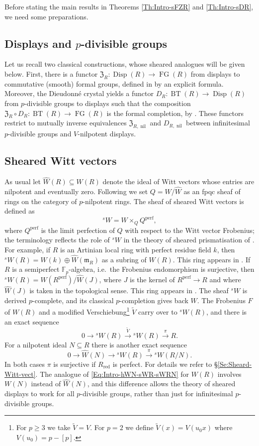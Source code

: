 \documentclass[a4paper,11pt]{amsart}
\theoremstyle{plain}
\theoremstyle{definition}
\theoremstyle{remark}
\newcommand{\beqn}{\begin{equation}}
\newcommand{\eeqn}{\end{equation}}
\numberwithin{equation}{section}
\newcommand{\Fm}{\mathfrak{m}}
\newcommand{\FZ}{\mathfrak{Z}}
\newcommand{\FF}{{\mathbb{F}}}
\DeclareMathOperator{\nil}{nil}
\DeclareMathOperator{\perf}{perf}
\DeclareMathOperator{\red}{red}
\DeclareMathOperator{\BT}{BT}
\DeclareMathOperator{\Disp}{Disp}
\DeclareMathOperator{\FG}{FG}
\newcommand{\limperf}{^{\perf}}
\newcommand{\sW}{{}^sW}
\begin{document}
Before stating the main results in Theorems \ref{Th:Intro-sFZR} and \ref{Th:Intro-sDR}, we need some preparations.

\subsection{Displays and $p$-divisible groups}

Let us recall two classical constructions, whose sheared analogues will be given below. 
First, there is a functor $\FZ_R\colon\Disp(R)\to\FG(R)$ from displays to commutative (smooth) formal groups, defined in \cite{Zink:The-display} by an explicit formula. Moreover, the Dieudonn\'e crystal yields a functor $D_R\colon\BT(R)\to\Disp(R)$ from $p$-divisible groups to displays such that the composition $\FZ_R\circ D_R\colon\BT(R)\to\FG(R)$ is the formal completion, by \cite{Lau:Smoothness}. These functors restrict to mutually inverse equivalences $\FZ_{R,\nil}$ and $D_{R,\nil}$ between infinitesimal $p$-divisible groups and $V$-nilpotent displays.

\subsection{Sheared Witt vectors}

As usual let $\hat W(R)\subseteq W(R)$ denote the ideal of Witt vectors whose entries are nilpotent and eventually zero.
Following \cite{Drinfeld:Ring-stacks-conjecturally, BMVZ} we set $Q=W/\hat W$ as an fpqc sheaf  of rings  on the category of $p$-nilpotent rings. The sheaf of sheared Witt vectors is defined as
\[
\sW=W\times_QQ\limperf,
\] 
where $Q\limperf$ is the limit perfection of $Q$ with respect to the Witt vector Frobenius; the terminology reflects the role of $\sW$ in the theory of sheared prismatisation of \cite{BKMVZ}.
For example, if $R$ is an Artinian local ring with perfect residue field $k$, then $\sW(R)=W(k)\oplus\hat W(\Fm_R)$ as a subring of $W(R)$. 
This ring appears in \cite{Zink:Dieudonne}.
If $R$ is a semiperfect $\FF_p$-algebra, i.e.\ the Frobenius endomorphism is surjective, then $\sW(R)=W(R\limperf)/\hat W(J)$, where $J$ is the kernel of $R\limperf\to R$ and where $\hat W(J)$ is taken in the topological sense. 
This ring appears in \cite{Lau:Gerbe}.
The sheaf $\sW$ is derived $p$-complete, and its classical $p$-completion gives back $W$.
The Frobenius $F$ of $W(R)$ and a modified Verschiebung\footnote{For $p\ge 3$ we take $\tilde V=V$. For $p=2$ we define $\tilde V(x)=V(u_0x)$ where $V(u_0)=p-[p]$.}
$\tilde V$ carry over to $\sW(R)$,
and there is an exact sequence 
\beqn
0\to\sW(R)\xrightarrow{\tilde V}\sW(R)\xrightarrow\pi R.
\eeqn
For a nilpotent ideal $N\subseteq R$ there is another exact sequence
\beqn
\label{Eq:Intro-hWN-sWR-sWRN}
0\to\hat W(N)\to\sW(R)\xrightarrow\pi\sW(R/N).
\eeqn
In both cases $\pi$ is surjective if $R_{\red}$ is perfect.
For details we refer to \S\ref{Se:Sheard-Witt-vect}.
The analogue of \eqref{Eq:Intro-hWN-sWR-sWRN} for $W(R)$ involves $W(N)$ instead of $\hat W(N)$, and this difference allows the theory of sheared displays to work for all $p$-divisible groups, rather than just for infinitesimal $p$-divisible groups.
\end{document}
